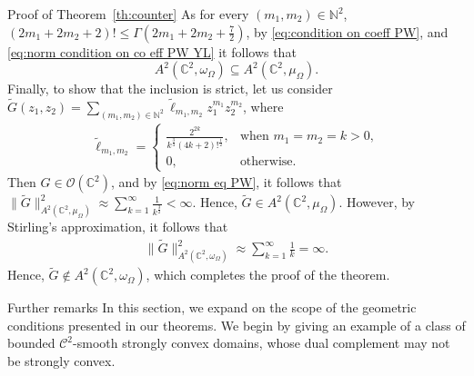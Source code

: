 \documentclass[11pt, oneside, reqno]{amsart}
\numberwithin{equation}{section}
\theoremstyle{definition}
\newcommand{\beas}{\begin{eqnarray*}}
\newcommand{\eeas}{\end{eqnarray*}}
\newcommand{\hol}{\mathcal {O}}
\newcommand{\cont}{\mathcal C}
\newcommand{\C}{\mathbb C}
\newcommand{\N}{\mathbb N}
\newcommand{\ltt}{\left(}
\newcommand{\rtt}{\right)}
\newcommand{\Om}{\Omega}
\begin{document}
{\begin{section}{Proof of Theorem~\ref{th:counter}}
{
As for every $(m_1,m_2)\in \N^2$, $(2m_1+2m_2+2)!\leq \Gamma\ltt2m_1+2m_2+\frac{7}{2}\rtt $, by \eqref{eq:condition on coeff PW}, and \eqref{eq:norm condition on co eff PW YL} it follows that
\[
A^2(\C^2,\omega_\Om)\subseteq A^2(\C^2,\mu_\Om).
\]
Finally, to show that the inclusion is strict, let us consider $\widetilde{G}(z_1,z_2)=\sum\limits_{(m_1,m_2)\in\N^2}\widetilde{\ell}_{m_1,m_2}z_1^{m_1}z_2^{m_2}$, where
    \beas
    \widetilde{\ell}_{m_1,m_2}=\begin{cases}
        \frac{2^{2k}}{k^{\frac{3}{4}} (4k+2)!^{\frac{1}{2}}},& \text{when } m_1=m_2=k>0,\\
          0,&\text{otherwise}.
      \end{cases} 
    \eeas
    Then $G\in\hol(\C^2)$, and by \eqref{eq:norm eq PW}, it follows that
    $\|\widetilde{G}\|_{A^2(\C^2,\mu_\Om)}^2\approx \sum\limits_{k=1}^\infty \frac{1}{k^\frac{3}{2}}<\infty.$ Hence, $\widetilde{G}\in A^2(\C^2,\mu_\Om)$.
    However, by Stirling's approximation, it follows that
  \begin{align*}
      \|\widetilde{G}\|_{A^2(\C^2,\omega_\Om)}^2\approx \sum\limits_{k=1}^\infty \frac{1}{k}=\infty.
  \end{align*}
  Hence, $\widetilde{G}\notin A^2(\C^2,\omega_\Om)$, which completes the proof of the theorem.}
  \end{section}
 \begin{section}{Further remarks}
 In this section, we expand on the scope of the geometric conditions presented in our theorems. We begin by giving an example of a class of bounded $\cont^2$-smooth strongly convex domains, whose dual complement may not be strongly convex.


\end{section}}
\end{document}
